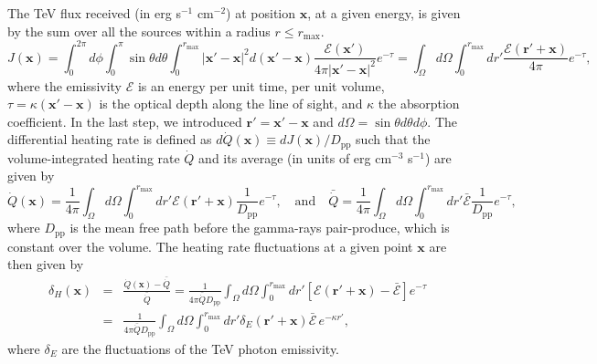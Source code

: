\documentclass[numberedappendix]{emulateapj}
\newcommand\ALc[1]{{\color{red} \bf #1}} %
\newcommand\Cc[1]{{\color{blue} \bf #1}} %
\begin{document}
The TeV flux received (in erg s$^{-1}$ cm$^{-2}$) at position $\mathbf{x}$, at a given energy, is given by the sum over all the sources within a radius $r\leqslant r_{\mathrm{max}}$.
\begin{equation}
  \label{eq:flux_recu0}
  J(\mathbf{x})=
  \int_{0}^{2\pi}d\phi\int_{0}^{\pi}\sin\theta d\theta\int_0^{r_{\mathrm{max}}}|\mathbf{x}'-\mathbf{x}|^2 d(\mathbf{x}'-\mathbf{x})
  \frac{\mathcal{E}(\mathbf{x}') }{4\pi |\mathbf{x}'-\mathbf{x}|^2} e^{-\tau}
  =\int_{\Omega} d\Omega\int_0^{r_{\mathrm{max}}} dr' \frac{\mathcal{E}(\mathbf{r}'+\mathbf{x}) }{4\pi } e^{-\tau},
\end{equation}
where the emissivity $\mathcal{E}$ is an energy per unit time, per unit volume, $\tau=\kappa (\mathbf{x}'-\mathbf{x})$ is the optical depth along the line of sight, and $\kappa$ the absorption coefficient. In the last step, we introduced $\mathbf{r'}=\mathbf{x}'-\mathbf{x}$ and $d\Omega=\sin\theta d\theta d\phi$. The differential heating rate is defined as $d\dot{Q}(\mathbf{x})\equiv dJ(\mathbf{x})/D_{\mathrm{pp}}$ such that the volume-integrated heating rate $\dot{Q}$ and its average (in units of erg cm$^{-3}$ s$^{-1}$) are given by 
\begin{equation}
  \label{eq:heating_rate0}
  \dot{Q}(\mathbf{x})=
  \frac{1}{4\pi}   \int_{\Omega}d\Omega\int_0^{r_{\mathrm{max}}} dr' \mathcal{E}(\mathbf{r}'+\mathbf{x}) \frac{1}{D_{\mathrm{pp}}} e^{-\tau},\quad\mbox{and}\quad
  \bar{\dot{Q}}= \frac{1}{4\pi}   \int_{\Omega}d\Omega\int_0^{r_{\mathrm{max}}} dr' \bar{\mathcal{E}} \frac{1}{D_{\mathrm{pp}}} e^{-\tau},
\end{equation}
where $D_{\mathrm{pp}}$ is the mean free path before the gamma-rays pair-produce, which is constant over the volume.
The heating rate fluctuations at a given point $\mathbf{x}$ are then given by 
\begin{eqnarray}
  \label{eq:heat_fluc_newt0}
  \delta_H(\mathbf{x})&=&\frac{\dot{Q}(\mathbf{x})-\bar{\dot{Q}}}{\bar{\dot{Q}}}=
  \frac{1}{4\pi\bar{\dot{Q}}D_{\mathrm{pp}}} \int_{\Omega}d\Omega\int_0^{r_{\mathrm{max}}} dr' 
  [\mathcal{E}(\mathbf{r}'+\mathbf{x})-\bar{\mathcal{E}}]e^{-\tau} \nonumber\\
  &=&\frac{1}{4\pi\bar{\dot{Q}}D_{\mathrm{pp}}}\int_{\Omega}d\Omega\int_0^{r_{\mathrm{max}}} dr' \delta_E(\mathbf{r}'+\mathbf{x})\bar{\mathcal{E}}\,e^{-\kappa r'} ,
\end{eqnarray}
where $\delta_E$ are the fluctuations of the TeV photon emissivity.
\end{document}
